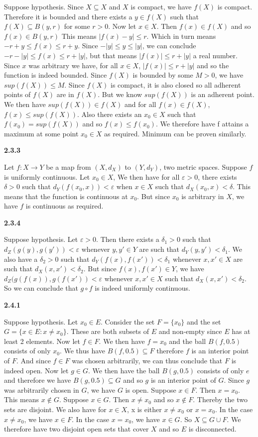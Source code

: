 \documentclass[12pt]{article}
\begin{document}
Suppose hypothesis. Since $X\subseteq X$ and $X$ is compact, we have $f(X)$ is compact. Therefore it is bounded and there exists a $y\in f(X)$ such that $f(X) \subseteq B(y,r)$ for some $r>0$. Now let $x\in X$. Then $f(x)\in f(X)$ and so $f(x) \in B(y,r)$ This means $|f(x)-y| \leq r$. Which in turn means $ -r +y \leq f(x) \leq r+y$. Since $-|y|\leq y\leq |y|$, we can conclude $ -r-|y| \leq f(x) \leq r+|y|$, but that means $|f(x)| \leq r+|y|$ a real number. Since $x$ was arbitrary we have, for all $x\in X$, $|f(x)| \leq r+|y|$ and so the function is indeed bounded. Since $f(X)$ is bounded by some $M>0$, we have $sup(f(X)) \leq M$. Since $f(X)$ is compact, it is also closed so all adherent points of $f(X)$ are in $f(X)$. But we know $sup(f(X))$ is an adherent point. We then have $sup(f(X))\in f(X)$ and for all $f(x) \in f(X)$, $f(x)\leq sup(f(X))$. Also there exists an $x_0 \in X$ such that $f(x_0) =sup(f(X))$ and so $f(x)\leq f(x_0)$. We therefore have f attains a maximum at some point $x_0 \in X$ as required. Minimum can be proven similarly.

\textbf{2.3.3}

Let $f:X\to Y$ be a map from $(X,d_X)$ to $(Y,d_Y)$, two metric spaces. Suppose $f$ is uniformly continuous. Let $x_0\in X$, We then have for all $\varepsilon>0$, there exists $\delta >0$ such that $d_Y(f(x_0,x))< \varepsilon$ when $x\in X$ such that $d_X(x_0,x)<\delta$. This means that the function is continuous at $x_0$. But since $x_0$ is arbitrary in $X$, we have $f$ is continuous as required.  

\textbf{2.3.4}

Suppose hypothesis. Let $\varepsilon>0$. Then there exists 
a $\delta_1>0$ such that $d_Z(g(y),g(y')) < \varepsilon$ whenever $y,y'\in Y$ are such that $d_Y(y,y')< \delta_1$. We also have a $\delta_2>0$ such that $d_Y(f(x),f(x'))< \delta_1$ whenever $x,x'\in X$ are such that $d_X(x,x')<\delta_2$. But since $f(x),f(x') \in Y$, we have $d_Z(g(f(x)),g(f(x'))< \varepsilon$ whenever $x,x'\in X$ such that $d_X(x,x')<\delta_2$. So we can conclude that $g\circ f$ is indeed uniformly continuous.

\textbf{2.4.1}

Suppose hypothesis. Let $x_0\in E$. Consider the set $F = \{x_0\}$ and the set $G = \{x\in E: x\neq x_0\}$. These are both subsets of $E$ and non-empty since $E$ has at least 2 elements. Now let $f\in F$. We then have $f = x_0$ and the ball $B(f,0.5)$ consists of only $x_0$. We thus have $B(f,0.5) \subseteq F$ therefore $f$ is an interior point of $F$. And since $f\in F$ was chosen arbitrarily, we can thus conclude that $F$ is indeed open. Now let $g\in G$. We then have the ball $B(g,0.5)$ consists of only $e$ and therefore we have $B(g,0.5) \subseteq G$ and so $g$ is an interior point of $G$. Since $g$ was arbitrarily chosen in $G$, we have $G$ is open. Suppose $x\in F$. Then $x=x_0$. This means $x\notin G$. Suppose $x\in G$. Then $x\neq x_0$ and so $x\notin F$. Thereby the two sets are disjoint. We also have for $x\in X$, x is either $x\neq x_0$ or $x= x_0$. In the case $ x\neq x_0$, we have $x\in F$. In the case $x = x_0$, we have $x\in G$. So $X\subseteq G\cup F$. We therefore have two disjoint open sets that cover $X$ and so $E$ is disconnected.
\end{document}
